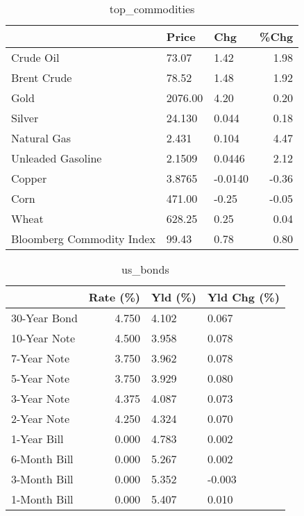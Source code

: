 \documentclass{article}%
\begin{document}
\begin{table}[htbp]%
\caption{top\_commodities}%
\centering%
\begin{adjustbox}{width=1\textwidth}%
\begin{tabular}{lllr}
\toprule
                          &   Price &     Chg &  \%Chg \\
\midrule
               Crude Oil  &   73.07 &    1.42 &  1.98 \\
             Brent Crude  &   78.52 &    1.48 &  1.92 \\
                    Gold  & 2076.00 &    4.20 &  0.20 \\
                  Silver  &  24.130 &   0.044 &  0.18 \\
             Natural Gas  &   2.431 &   0.104 &  4.47 \\
       Unleaded Gasoline  &  2.1509 &  0.0446 &  2.12 \\
                  Copper  &  3.8765 & -0.0140 & -0.36 \\
                    Corn  &  471.00 &   -0.25 & -0.05 \\
                   Wheat  &  628.25 &    0.25 &  0.04 \\
Bloomberg Commodity Index &   99.43 &    0.78 &  0.80 \\
\bottomrule
\end{tabular}
%
\end{adjustbox}%
\end{table}

%


\begin{table}[htbp]%
\caption{us\_bonds}%
\centering%
\begin{adjustbox}{width=1\textwidth}%
\begin{tabular}{lrll}
\toprule
             &  Rate (\%) & Yld (\%) & Yld Chg (\%) \\
\midrule
30-Year Bond &     4.750 &   4.102 &       0.067 \\
10-Year Note &     4.500 &   3.958 &       0.078 \\
 7-Year Note &     3.750 &   3.962 &       0.078 \\
 5-Year Note &     3.750 &   3.929 &       0.080 \\
 3-Year Note &     4.375 &   4.087 &       0.073 \\
 2-Year Note &     4.250 &   4.324 &       0.070 \\
 1-Year Bill &     0.000 &   4.783 &       0.002 \\
6-Month Bill &     0.000 &   5.267 &       0.002 \\
3-Month Bill &     0.000 &   5.352 &      -0.003 \\
1-Month Bill &     0.000 &   5.407 &       0.010 \\
\bottomrule
\end{tabular}
%
\end{adjustbox}%
\end{table}
\end{document}
